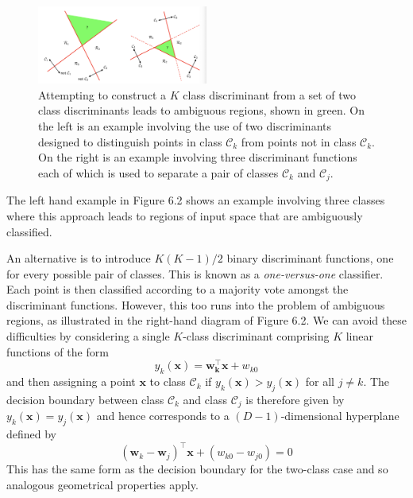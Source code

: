 \documentclass[twoside]{article}
\begin{document}
\begin{figure}[h]
    \centering
    \includegraphics[width=0.50\textwidth]{img/multiclass.png}
    \caption{Attempting to construct a $K$ class discriminant from a set of two class discriminants leads to ambiguous regions, shown in green. On the left is an example involving the use of two discriminants designed to distinguish points in class $\mathcal{C}_k$ from points not in class $\mathcal{C}_k$. On the right is an example involving three discriminant functions each of which is used to separate a pair of classes $\mathcal{C}_k$ and $\mathcal{C}_j$.}
\end{figure}
The left hand example in Figure 6.2 shows an example involving three classes where this approach leads to regions of input space that are ambiguously classified.\medskip

An alternative is to introduce $K(K - 1) / 2$ binary discriminant functions, one for every possible pair of classes. This is known as a \textit{one-versus-one} classifier. Each point is then classified according to a majority vote amongst the discriminant functions. However, this too runs into the problem of ambiguous regions, as illustrated in the right-hand diagram of Figure 6.2.
\newpage
We can avoid these difficulties by considering a single $K$-class discriminant comprising $K$ linear functions of the form
\begin{equation*}
    y_k(\boldsymbol{x}) = \boldsymbol{w_k^\intercal x} + w_{k0}
\end{equation*}
and then assigning a point $\boldsymbol{x}$ to class $\mathcal{C}_k$ if $y_k(\boldsymbol{x}) > y_j(\boldsymbol{x})$ for all $j \neq k$. The decision boundary between class $\mathcal{C}_k$ and class $\mathcal{C}_j$ is therefore given by $y_k(\boldsymbol{x}) = y_j(\boldsymbol{x})$ and hence corresponds to a $(D-1)$-dimensional hyperplane defined by
\begin{equation*}
    (\boldsymbol{w}_k - \boldsymbol{w}_j)^\intercal\boldsymbol{x} + (w_{k0} - w_{j0}) = 0
\end{equation*}
This has the same form as the decision boundary for the two-class case and so analogous geometrical properties apply.
\end{document}
